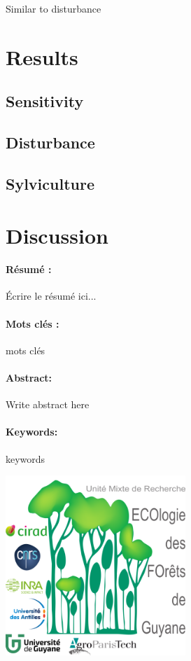 \documentclass[]{article}
\let\oldsection\section
\renewcommand\section{\newpage\oldsection}
\theoremstyle{definition}
\theoremstyle{definition}
\theoremstyle{remark}
\begin{document}
Similar to disturbance

\section{Results}\label{results}

\subsection{Sensitivity}\label{sensitivity}

\subsection{Disturbance}\label{disturbance-1}

\subsection{Sylviculture}\label{sylviculture}

\section{Discussion}\label{discussion}


\listoftables
\listoffigures

  \newpage
  \paragraph{Résumé :}
  Écrire le résumé ici...
  \paragraph{Mots clés :} mots clés
  \newline\newline
  \paragraph{Abstract:}
  Write abstract here
  \paragraph{Keywords:} keywords
  
  \vspace*{\fill}
  \includegraphics{images/logo}
\end{document}
